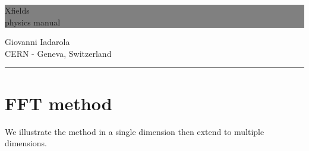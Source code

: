 \documentclass[a4paper,12pt]{report}
\newcommand{\HRule}[1]{\hfill \rule{0.2\linewidth}{#1}}
\begin{document}
\thispagestyle{empty} %


\colorbox{Gray}{
	\parbox[t]{1.0\linewidth}{
		\centering \fontsize{28pt}{40pt}\selectfont %
		\vspace*{0.7cm} %
		
		\hfill Xfields \\
		\hfill physics manual

		
		\vspace*{0.7cm} %
	}
}


                \vfill


{\centering \large 
\hfill Giovanni Iadarola \\
\hfill CERN - Geneva, Switzerland

\HRule{1pt}} %


\clearpage %

\newpage

\renewcommand*{\arraystretch}{1.4}


\section{FFT method}

We illustrate the method in a single dimension then extend to multiple dimensions.
\end{document}
